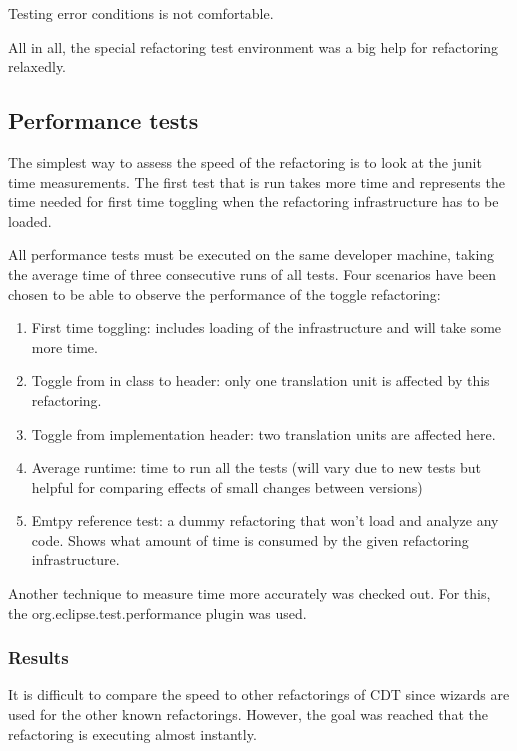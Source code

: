 Testing error conditions is not comfortable. %

All in all, the special refactoring test environment was a big help for 
refactoring relaxedly.

\subsection{Performance tests}

The simplest way to assess the speed of the refactoring is to look at the junit 
time measurements. The first test that is run takes more time and represents the 
time needed for first time toggling when the refactoring infrastructure has to 
be loaded. 

All performance tests must be executed on the same developer machine, taking the 
average time of three consecutive runs of all tests. Four scenarios have been 
chosen to be able to observe the performance of the toggle refactoring:

\begin{enumerate}
\item First time toggling: includes loading of the infrastructure and will take 
some more time.
\item Toggle from in class to header: only one translation unit is affected by 
this refactoring.
\item Toggle from implementation header: two translation units are affected here.
\item Average runtime: time to run all the tests (will vary due to new tests but 
helpful for comparing effects of small changes between versions)
\item Emtpy reference test: a dummy refactoring that won't load and analyze any 
code. Shows what amount of time is consumed by the given refactoring 
infrastructure.
\end{enumerate}

Another technique to measure time more accurately was checked out. For this, the 
org.eclipse.test.performance plugin was used. 

\subsubsection{Results}

It is difficult to compare the speed to other refactorings of CDT since wizards 
are used for the other known refactorings. However, the goal was reached that 
the refactoring is executing almost instantly.

